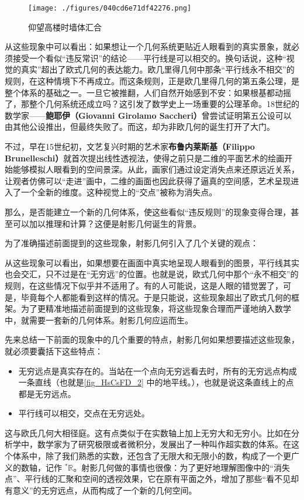 \begin{figure}[ht]
\centering
\texttt{[image: ./figures/040cd6e71df42276.png]}
\caption{仰望高楼时墙体汇合} \label{fig_HsCsFD_3}
\end{figure}

从这些现象中可以看出：如果想让一个几何系统更贴近人眼看到的真实景象，就必须接受一个看似“违反常识”的结论——平行线是可以相交的。换句话说，这种“视觉的真实”超出了欧式几何的表达能力。欧几里得几何中那条“平行线永不相交”的规则，在这种情境下不再成立。而这条规则，正是欧几里得几何的第五条公理，是整个体系的基础之一。一旦它被推翻，人们自然开始感到不安：如果根基都动摇了，那整个几何系统还成立吗？这引发了数学史上一场重要的公理革命。18世纪的数学家——\textbf{鲍耶伊（Giovanni Girolamo Saccheri）}曾尝试证明第五公设可以由其他公设推出，但最终失败了。而这，却为非欧几何的诞生打开了大门。

不过，早在15世纪初，文艺复兴时期的艺术家\textbf{布鲁内莱斯基（Filippo Brunelleschi）}就首次提出线性透视法，使得之前只是二维的平面艺术的绘画开始能够模拟人眼看到的空间景深。从此，画家们通过设定消失点来还原远近关系，让观者仿佛可以“走进”画中，二维的画面也因此获得了逼真的空间感，艺术呈现进入了一个全新的维度。这种视觉上的“交点”被称为消失点。



那么，是否能建立一个新的几何体系，使这些看似“违反规则”的现象变得合理，甚至可以加以推理和计算？这便是射影几何诞生的背景。

为了准确描述前面提到的这些现象，射影几何引入了几个关键的观点：

从这些现象可以看出，如果想要在画面中真实地呈现人眼看到的图景，平行线其实也会交汇，只不过是在“无穷远”的位置。也就是说，欧式几何中那个“永不相交”的规则，在这些情况下似乎并不适用了。有的人可能说，这是人眼的错觉罢了，可是，毕竟每个人都能看到这样的情况。于是只能说，这些现象超出了欧式几何的框架。为了更精准地描述前面提到的这些现象，将这些现象合理而严谨地纳入数学中，就需要一套新的几何体系。射影几何应运而生。

先来总结一下前面的现象中的几个重要的特点，射影几何如果想要描述这些现象，就必须要囊括下这些特点：
\begin{itemize}
\item 无穷远点是真实存在的。当站在一个点向无穷远看去时，所有的无穷远点构成一条直线（也就是\autoref{fig_HsCsFD_2} 中的地平线。），也就是说这条直线上的点都是无穷远点。
\item 平行线可以相交，交点在无穷远处。
\end{itemize}

这与欧氏几何大相径庭。这有点类似于在实数轴上加上无穷大和无穷小。比如在分析学中，数学家为了研究极限或者微积分，发展出了一种叫作超实数的体系。在这个体系中，除了我们熟悉的实数，还包含了无限大和无限小的数，构成了一个更广义的数轴，记作 $^*\mathbb{R}$。射影几何做的事情也很像：为了更好地理解图像中的“消失点”、平行线的汇聚和空间的透视效果，它在原有平面之外，增加了那些“看不见却有意义”的无穷远点，从而构成了一个新的几何空间。


